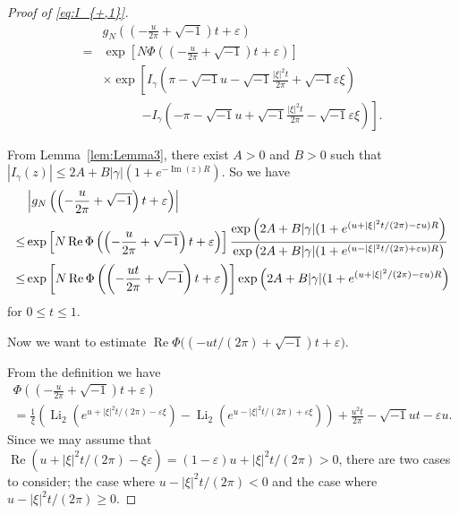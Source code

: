 \documentclass[a4paper]{amsart}
\theoremstyle{plain}
\theoremstyle{definition}
\theoremstyle{remark}
\newcommand{\Li}{\operatorname{Li}}
\renewcommand{\Re}{\operatorname{Re}}
\renewcommand{\Im}{\operatorname{Im}}
\numberwithin{equation}{section}
\begin{document}
\begin{proof}[Proof of \eqref{eq:I_{+,1}}]
\begin{equation*}
\begin{split}
  &g_{N}\left(\left(-\frac{u}{2\pi}+\sqrt{-1}\right)t+\varepsilon\right)
  \\
  =&
  \exp
  \left[
    N\Phi\left(\left(-\frac{u}{2\pi}+\sqrt{-1}\right)t+\varepsilon\right)
  \right]
  \\
  &
  \times
  \exp
  \left[
    I_{\gamma}
    \left(
      \pi-\sqrt{-1}u-\sqrt{-1}\frac{|\xi|^2t}{2\pi}+\sqrt{-1}\varepsilon\xi
    \right)
  \right.
  \\
  &\phantom{\times\exp\bigl[}
  \left.
    -
    I_{\gamma}
    \left(
      -\pi-\sqrt{-1}u+\sqrt{-1}\frac{|\xi|^2t}{2\pi}-\sqrt{-1}\varepsilon\xi
    \right)
  \right].
\end{split}
\end{equation*}
\par
From Lemma~\ref{lem:Lemma3}, there exist $A>0$ and $B>0$ such that $|I_{\gamma}(z)|\le 2A+B|\gamma|(1+e^{-\Im(z)R})$.
So we have
\begin{equation}\label{eq:I_{+,1}Phi}
\begin{split}
  &
  \left|
    g_{N}\left(\left(-\frac{u}{2\pi}+\sqrt{-1}\right)t+\varepsilon\right)
  \right|
  \\
  \le&
  \exp
  \left[
    N\Re\Phi\left(\left(-\frac{u}{2\pi}+\sqrt{-1}\right)t+\varepsilon\right)
  \right]
  \frac{\exp\left(2A+B|\gamma|(1+e^{(u+|\xi|^2t/(2\pi)-\varepsilon u)R}\right)}
       {\exp\left(2A+B|\gamma|(1+e^{(u-|\xi|^2t/(2\pi)+\varepsilon u)R}\right)}
  \\
  \le&
  \exp
  \left[
    N\Re\Phi\left(\left(-\frac{ut}{2\pi}+\sqrt{-1}\right)t+\varepsilon\right)
  \right]
  \exp\left(2A+B|\gamma|(1+e^{(u+|\xi|^2/(2\pi)-\varepsilon u)R}\right)
\end{split}
\end{equation}
for $0\le t\le1$.
\par
Now we want to estimate $\Re\Phi\bigl((-ut/(2\pi)+\sqrt{-1})t+\varepsilon\bigr)$.
\par
From the definition we have
\begin{multline*}
  \Phi\left(\left(-\frac{u}{2\pi}+\sqrt{-1}\right)t+\varepsilon\right)
  \\
  =
  \frac{1}{\xi}
  \left(
    \Li_2(e^{u+|\xi|^2t/(2\pi)-\varepsilon\xi})
    -
    \Li_2(e^{u-|\xi|^2t/(2\pi)+\varepsilon\xi})
  \right)
  +\frac{u^2t}{2\pi}-\sqrt{-1}ut-\varepsilon u.
\end{multline*}
Since we may assume that $\Re(u+|\xi|^2t/(2\pi)-\xi\varepsilon)=(1-\varepsilon)u+|\xi|^2t/(2\pi)>0$, there are two cases to consider; the case where $u-|\xi|^2t/(2\pi)<0$ and the case where $u-|\xi|^2t/(2\pi)\ge0$.

\end{proof}
\end{document}
